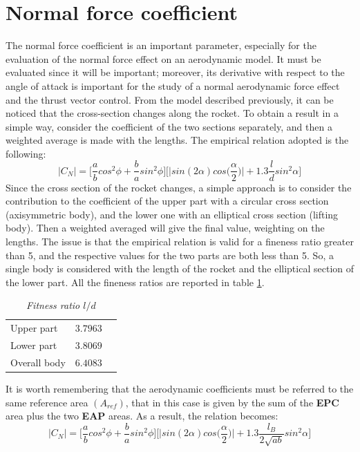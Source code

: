 \documentclass[12pt,fleqn,openany]{book} %
\begin{document}
\section{Normal force coefficient}
The normal force coefficient is an important parameter, especially for the evaluation of the normal force effect on an aerodynamic model. It must be evaluated since it will be important; moreover, its derivative with respect to the angle of attack is important for the study of a normal aerodynamic force effect and the thrust vector control. From the model described previously, it can be noticed that the cross-section changes along the rocket. To obtain a result in a simple way, consider the coefficient of the two sections separately, and then a weighted average is made with the lengths. The empirical relation adopted is the following: \begin{equation}
 |C_N|=\Biggl[\frac{a}{b}cos^2\phi+\frac{b}{a}sin^2\phi\Biggr]\Biggl[\biggl|sin(2\alpha)cos\biggl(\frac{\alpha}{2}\biggr)\biggr|+1.3\frac{l}{d}sin^2\alpha\Biggr]
\end{equation}
Since the cross section of the rocket changes, a simple approach is to consider the contribution to the coefficient of the upper part with a circular cross section (axisymmetric body), and the lower one with an elliptical cross section (lifting body). Then a weighted averaged will give the final value, weighting on the lengths. The issue is that the empirical relation is valid for a fineness ratio greater than 5, and the respective values for the two parts are both less than 5. So, a single body is considered with the length of the rocket and the elliptical section of the lower part. All the fineness ratios are reported in table \hypertarget{tab:baseline}{\ref{tab:baseline}}. 
\begin{table}[h]
	\centering
	\begin{tabular}{ l l l }
\toprule
Upper part			&$3.7963$\\                                                 
Lower part	        &$3.8069$\\
Overall body		&$6.4083$\\
\bottomrule
\end{tabular} 
\caption{\emph{Fitness ratio $l/d$}}
\label{tab:baseline}
\end{table}\newpage
\noindent It is worth remembering that the aerodynamic coefficients must be referred to the same reference area $(A_{ref})$, that in this case is given by the sum of the \textbf{EPC} area plus the two \textbf{EAP} areas. As a result, the relation becomes: \begin{equation}
 |C_N|=\Biggl[\frac{a}{b}cos^2\phi+\frac{b}{a}sin^2\phi\Biggr]\Biggl[\biggl|sin(2\alpha)cos\biggl(\frac{\alpha}{2}\biggr)\biggr|+1.3\frac{l_B}{2\sqrt{ab}}sin^2\alpha\Biggr]
\end{equation}
\end{document}
